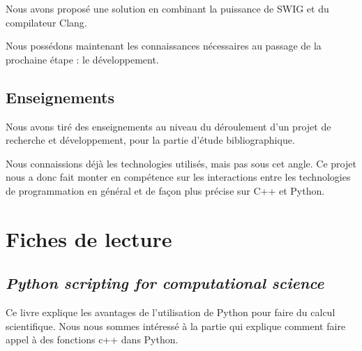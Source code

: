 \documentclass[11pt, french, screen]{report-rd-info}
\begin{document}
Nous avons proposé une solution en combinant la puissance de SWIG et du compilateur Clang.

Nous possédons maintenant les connaissances nécessaires au passage de la prochaine étape : le développement.

\section{Enseignements}
Nous avons tiré des enseignements au niveau du déroulement d'un projet de recherche et développement, pour la partie d'étude bibliographique.

Nous connaissions déjà les technologies utilisés, mais pas sous cet angle. Ce projet nous a donc fait monter en compétence sur les interactions entre les technologies de programmation en général et de façon plus précise sur C++ et Python.


\printbibliography{}

\listoffigures{}

\listoftables{}


\appendix




\chapter{Fiches de lecture}
\label{ann:FichesLecture}

\section{\emph{Python scripting for computational science}}

Ce livre \cite{2007PSFCSHans} explique les avantages de l'utilisation de Python pour faire du calcul scientifique. Nous nous sommes intéressé à la partie qui explique comment faire appel à des fonctions c++ dans Python.
\end{document}
